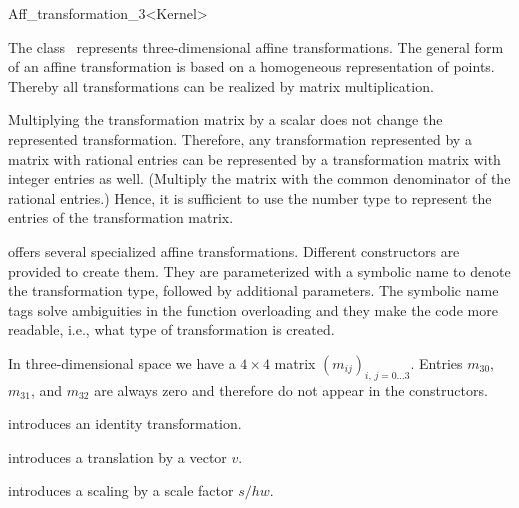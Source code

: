 \begin{ccRefClass}{Aff_transformation_3<Kernel>}

\ccDefinition
The class \ccRefName\ represents three-dimensional affine transformations. 
The general form of an affine transformation is based on a homogeneous
representation of points. Thereby all transformations can be realized by
matrix multiplication. 

Multiplying the transformation matrix by a scalar does not change the
represented transformation. Therefore, any transformation represented
by a matrix with rational entries can be represented by a
transformation matrix with integer entries as well. (Multiply the
matrix with the common denominator of the rational entries.) Hence, it
is sufficient to use the number type  to represent
the entries of the transformation matrix.

{\cgal} offers several specialized affine transformations. Different
constructors are provided to create them. They are parameterized with
a symbolic name to denote the transformation type, followed by
additional parameters. The symbolic name tags solve ambiguities in the
function overloading and they make the code more readable, i.e., what
type of transformation is created.

In three-dimensional space we have a $4\times 4$ matrix
${(m_{ij})}_{i,\,j=0\ldots 3}$.  Entries $m_{30}$, $m_{31}$, and
$m_{32}$ are always zero and therefore do not appear in the
constructors.

\ccCreation
{}

            {introduces an identity transformation.}


            {introduces a translation by a vector $v$.}
 
            {introduces a scaling by a scale factor $s/hw$.}

\newsavebox{\arrthree}
\newsavebox{\arrlinthree}
\newsavebox{\transvecthree}



\end{ccRefClass}
